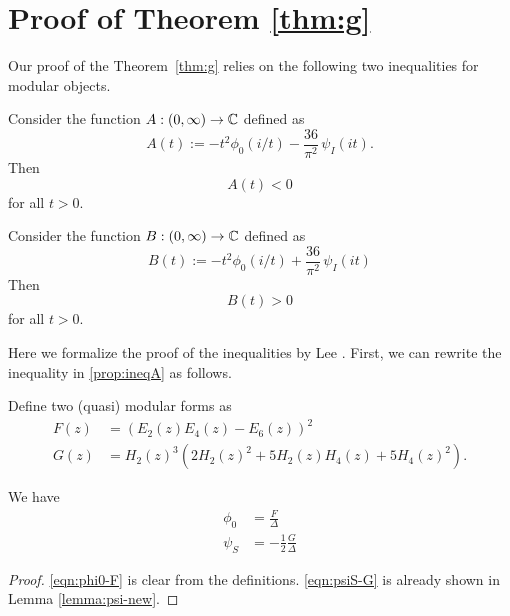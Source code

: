 \section{Proof of Theorem \ref{thm:g}}\label{sec: g}
Our proof of the Theorem~\ref{thm:g} relies on the following two inequalities for modular objects.
\begin{proposition}\label{prop:ineqA}\leanok
Consider the function $A:(0,\infty)\to\mathbb{C}$ defined as
\begin{equation}\label{eqn:defA}
A(t):=-t^2\phi_0(i/t)-\frac{36}{\pi^2}\,\psi_I(it).
\end{equation}
Then
\begin{equation}\label{eqn:ineqA}
    A(t) < 0
\end{equation}
for all $t > 0$.
\end{proposition}

\begin{proposition}\label{prop:ineqB}\leanok
Consider the function $B:(0,\infty)\to\mathbb{C}$ defined as
\begin{equation}\label{eqn:defB}
    B(t) := -t^2\phi_0(i/t)+\frac{36}{\pi^2}\,\psi_I(it)
\end{equation}
Then
\begin{equation}\label{eqn:ineqB}
    B(t) > 0
\end{equation}
for all $t > 0$.
\end{proposition}

Here we formalize the proof of the inequalities by Lee \cite{Lee}.
First, we can rewrite the inequality in \ref{prop:ineqA} as follows.

\begin{definition}\label{def:FG-definition}\leanok
Define two (quasi) modular forms as
\begin{align}
    F(z) &= (E_2(z) E_4(z) - E_6(z))^2 \label{eqn:defF} \\
    G(z) &= H_2(z)^{3} (2 H_{2}(z)^{2} + 5 H_{2}(z) H_{4}(z) + 5 H_{4}(z)^{2}). \label{eqn:defG}
\end{align}
\end{definition}

\begin{lemma}\label{lemma:F-G-phi-psi-identities}\leanok
We have
\begin{align}
    \phi_0 &= \frac{F}{\Delta} \label{eqn:phi0-F} \\
    \psi_S &= -\frac{1}{2} \frac{G}{\Delta}\label{eqn:psiS-G}
\end{align}
\end{lemma}
\begin{proof}\leanok
\eqref{eqn:phi0-F} is clear from the definitions.
\eqref{eqn:psiS-G} is already shown in Lemma \ref{lemma:psi-new}.
\end{proof}

